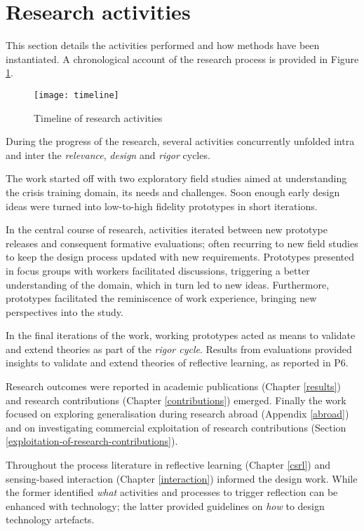 \section{Research activities}\label{research-activities}

This section details the activities performed and how methods have been instantiated. A chronological account of the research process is provided in Figure \ref{fig:research-activities}.
\begin{figure}
	[ptb] \centering 
	\texttt{[image: timeline]} \caption{Timeline of research activities} \label{fig:research-activities} 
\end{figure}

During the progress of the research, several activities concurrently unfolded intra and inter the \emph{relevance}, \emph{design} and \emph{rigor} cycles.

The work started off with two exploratory field studies aimed at understanding the crisis training domain, its needs and challenges. Soon enough early design ideas were turned into low-to-high fidelity prototypes in short iterations. 

In the central course of research, activities iterated between new prototype releases and consequent formative evaluations; often recurring to new field studies to keep the design process updated with new requirements. Prototypes presented in focus groups with workers facilitated discussions, triggering a better understanding of the domain, which in turn led to new ideas. Furthermore, prototypes facilitated the reminiscence of work experience, bringing new perspectives into the study.

In the final iterations of the work, working prototypes acted as means to validate and extend theories as part of the \emph{rigor cycle}. Results from evaluations provided insights to validate and extend theories of reflective learning, as reported in P6. 

Research outcomes were reported in academic publications (Chapter \ref{results}) and research contributions (Chapter \ref{contributions}) emerged. Finally the work focused on exploring generalisation during research abroad (Appendix \ref{abroad}) and on investigating commercial exploitation of research contributions (Section \ref{exploitation-of-research-contributions}).

Throughout the process literature in reflective learning (Chapter \ref{csrl}) and sensing-based interaction (Chapter \ref{interaction}) informed the design work. While the former identified \emph{what} activities and processes to trigger reflection can be enhanced with technology; the latter provided guidelines on \emph{how} to design technology artefacts.

